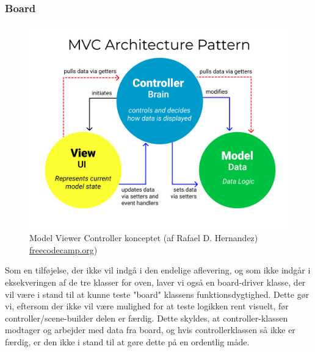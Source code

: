 \subsubsection{Board}
\begin{figure}[H]
    \centering
    \caption{Model Viewer Controller konceptet (af Rafael D. Hernandez) \href{https://www.freecodecamp.org/news/the-model-view-controller-pattern-mvc-architecture-and-frameworks-explained/}{freecodecamp.org})}\label{fig:my_label}
    \includegraphics[width=.5\textwidth]{Graphics/MVC3.png}
\end{figure}

Som en tilføjelse, der ikke vil indgå i den endelige aflevering, og som ikke indgår i eksekveringen af de tre klasser for oven, laver vi også en board-driver klasse, der vil være i stand til at kunne teste "board" klassens funktionsdygtighed. Dette gør vi, eftersom der ikke vil være mulighed for at teste logikken rent visuelt, før controller/scene-builder delen er færdig. Dette skyldes, at controller-klassen modtager og arbejder med data fra board, og hvis controllerklassen så ikke er færdig, er den ikke i stand til at gøre dette på en ordentlig måde. 